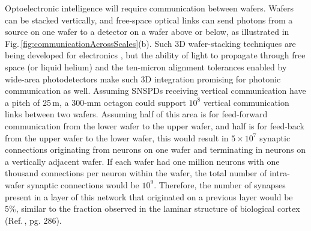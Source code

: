 \documentclass[twocolumn]{article}
\begin{document}
\begin{figure} 
\end{figure}
Optoelectronic intelligence will require communication between wafers. Wafers can be stacked vertically, and free-space optical links can send photons from a source on one wafer to a detector on a wafer above or below, as illustrated in Fig.\,\ref{fig:communicationAcrossScales}(b). Such 3D wafer-stacking techniques are being developed for electronics \cite{shhi2017,sani2018}, but the ability of light to propagate through free space (or liquid helium) and the ten-micron alignment tolerances enabled by wide-area photodetectors \cite{mave2013} make such 3D integration promising for photonic communication as well. Assuming SNSPDs receiving vertical communication have a pitch of 25\,\textmu m, a 300-mm octagon could support $10^8$ vertical communication links between two wafers. Assuming half of this area is for feed-forward communication from the lower wafer to the upper wafer, and half is for feed-back from the upper wafer to the lower wafer, this would result in $5\times10^7$ synaptic connections originating from neurons on one wafer and terminating in neurons on a vertically adjacent wafer. If each wafer had one million neurons with one thousand connections per neuron within the wafer, the total number of intra-wafer synaptic connections would be $10^9$. Therefore, the number of synapses present in a layer of this network that originated on a previous layer would be 5\%, similar to the fraction observed in the laminar structure of biological cortex (Ref.\,\cite{bu2006}, pg. 286).
\end{document}
